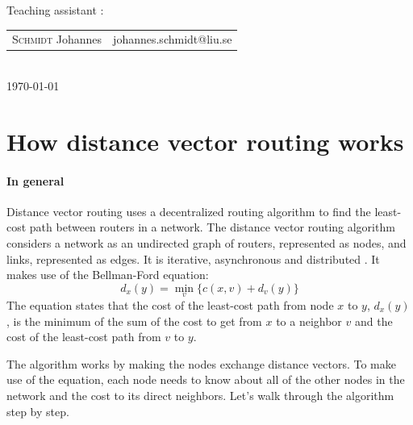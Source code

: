 \documentclass[12pt,a4paper]{article}
\begin{document}
\begin{titlepage}
\normalsize
Teaching assistant :\\[0.2cm]
{\begin{tabular}{ll}
\textsc{Schmidt} Johannes & johannes.schmidt@liu.se \\
\end{tabular}}
\\[2cm]

\vfill
{\normalsize \today} %

\newpage

\end{titlepage}



  
\section{How distance vector routing works}
\paragraph{In general}
Distance vector routing uses a decentralized routing algorithm to find the least-cost path between routers in a network.
The distance vector routing algorithm considers a network as an undirected graph of routers, represented as nodes, and links, represented as edges. It is iterative, asynchronous and distributed \cite[p.~371]{cn}. It makes use of the Bellman-Ford equation:
\begin{equation}
d_x(y) = \min_v\{c(x,v) + d_v(y)\}
\label{eq:bf}
\end{equation}
The equation states that the cost of the least-cost path from node $x$ to $y$, $d_x(y)$, is the minimum of the sum of the cost to get from $x$ to a neighbor $v$ and the cost of the least-cost path from $v$ to $y$.

The algorithm works by making the nodes exchange distance vectors.
To make use of the equation, each node needs to know about all of the other nodes in the network and the cost to its direct neighbors. Let's walk through the algorithm step by step.
\end{document}
